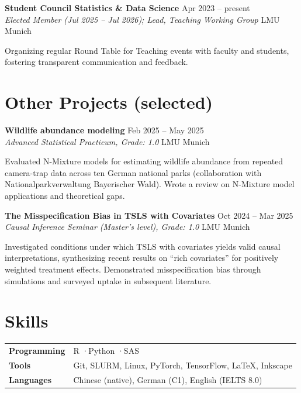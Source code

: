 \documentclass[a4paper,11pt]{article}
\newcommand{\entry}[4]{%
  \textbf{#1} \hfill #2\\
  \textit{#3} \hfill #4\par
}
\newenvironment{details}{%
  \begin{list}{}{%
    \setlength{\leftmargin}{1.5em}%
    \setlength{\rightmargin}{0pt}%
    \setlength{\topsep}{0.1em}%
    \setlength{\parsep}{0.2em}%
    \setlength{\itemsep}{0pt}%
  }%
  \item[]%
}{%
  \end{list}%
}
\begin{document}
\entry{Student Council Statistics \& Data Science}{Apr 2023 -- present}
      {Elected Member (Jul 2025 -- Jul 2026); Lead, Teaching Working Group}{LMU Munich}
\begin{details}
Organizing regular Round Table for Teaching events with faculty and students, fostering transparent communication and feedback.
\end{details}

\section*{Other Projects (selected)}

\entry{Wildlife abundance modeling}{Feb 2025 -- May 2025}
      {Advanced Statistical Practicum, Grade: 1.0}{LMU Munich}
\begin{details}
Evaluated N-Mixture models for estimating wildlife abundance from repeated camera-trap data across ten German national parks (collaboration with Nationalparkverwaltung Bayerischer Wald). Wrote a review on N-Mixture model applications and theoretical gaps.
\end{details}

\entry{The Misspecification Bias in TSLS with Covariates}{Oct 2024 -- Mar 2025}
      {Causal Inference Seminar (Master's level), Grade: 1.0}{LMU Munich}
\begin{details}
Investigated conditions under which TSLS with covariates yields valid causal interpretations, synthesizing recent results on ``rich covariates'' for positively weighted treatment effects. Demonstrated misspecification bias through simulations and surveyed uptake in subsequent literature.
\end{details}
\section*{Skills}

\renewcommand{\arraystretch}{1.3}
\begin{tabularx}{\linewidth}{@{} l X @{}}
\textbf{Programming} & R \enspace·\enspace Python \enspace·\enspace SAS \\
\textbf{Tools} & Git, SLURM, Linux, PyTorch, TensorFlow, \LaTeX, Inkscape\\
\textbf{Languages} & Chinese (native), German (C1), English (IELTS 8.0)
\end{tabularx}
\renewcommand{\arraystretch}{1.0}
\end{document}
